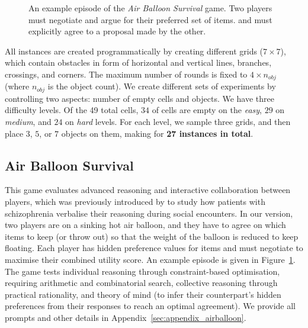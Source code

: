 \documentclass[11pt]{article}
\begin{document}
\begin{figure}[ht]
    \centering
    
    \caption{An example episode of the \textit{Air Balloon Survival} game. Two players must negotiate and argue for their preferred set of items. and must explicitly agree to a proposal made by the other.}
    \label{fig:air_balloon_example}
    
\end{figure}

All instances are created programmatically by creating different grids ($7\times7$), which contain obstacles in form of horizontal and vertical lines, branches, crossings, and corners. The maximum number of rounds is fixed to $4 \times n_{obj}$ (where $n_{obj}$ is the object count). 
We create different sets of experiments by controlling two aspects: number of empty cells and objects. We have three difficulty levels. Of the 49 total cells, $34$ of cells are empty on the \textit{easy}, $29$ on \textit{medium}, and $24$ on \textit{hard} levels. For each level, we sample three grids, and then place $3$, $5$, or $7$ objects on them, making for \textbf{27 instances in total}.



\subsection{Air Balloon Survival}
This game evaluates advanced reasoning and interactive collaboration between players, which was previously introduced by \citet{howes2021justifiable} to study how patients with schizophrenia verbalise their reasoning during social encounters. In our version, two players are on a sinking hot air balloon, and they have to agree on which items to keep (or throw out) so that the weight of the balloon is reduced to keep floating. Each player has hidden preference values for items and must negotiate to maximise their combined utility score. An example episode is given in Figure~\ref{fig:air_balloon_example}. The game tests individual reasoning through constraint-based optimisation, requiring arithmetic and combinatorial search, collective reasoning through practical rationality, and theory of mind (to infer their counterpart's hidden preferences from their responses to reach an optimal agreement). We provide all prompts and other details in Appendix~\ref{sec:appendix_airballoon}.
\end{document}

